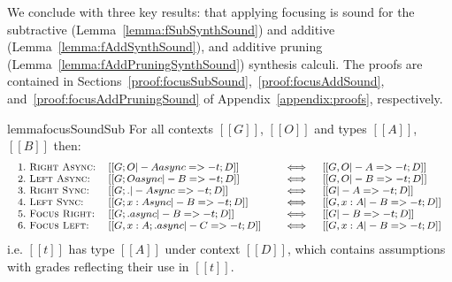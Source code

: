 We conclude with three key results: that applying focusing is sound for the
subtractive (Lemma~\ref{lemma:fSubSynthSound}) and additive
(Lemma~\ref{lemma:fAddSynthSound}), and additive pruning
(Lemma~\ref{lemma:fAddPruningSynthSound}) synthesis calculi. The proofs are
contained in Sections~\ref{proof:focusSubSound},~\ref{proof:focusAddSound},
and~\ref{proof:focusAddPruningSound} of Appendix~\ref{appendix:proofs},
respectively.

\begin{restatable}{lemma}{focusSoundSub}
  \label{lemma:fSubSynthSound}
For all contexts $[[ G ]]$, $[[ O ]]$ and types $[[ A ]]$, $[[ B]]$
then:
\begin{align*}
  {\footnotesize{
\begin{array}{lll}
 1.\ \textsc{Right Async:} & [[ G ; O |- A async =>- t ; D ]] \quad &\iff \quad [[ G , O |- A =>- t ; D ]]\\
 2.\ \textsc{Left Async:} & [[ G ; O async |- B =>- t ; D ]] \quad &\iff \quad [[ G , O |- B =>- t ; D ]]\\
 3.\ \textsc{Right Sync:} & [[ G ; . |- A sync =>- t ; D ]] \quad &\iff \quad [[ G |- A =>- t ; D ]]\\
 4.\ \textsc{Left Sync:} & [[ G ; {x : A }sync |- B =>- t ; D ]] \quad &\iff \quad [[ G, x : A |- B =>- t ; D ]]\\
 5.\ \textsc{Focus Right:} & [[ G ; . async |- B =>- t ; D ]] \quad &\iff \quad [[ G |- B =>- t ; D ]]\\
 6.\ \textsc{Focus Left:} & [[ G, x : A ; . async |- C =>- t ; D ]] \quad &\iff \quad [[ G, x : A |- B =>- t ; D ]]
\end{array}
  }}
\end{align*}
i.e. $[[ t ]]$ has type $[[ A ]]$
under context $[[ D ]]$,
which contains assumptions with grades reflecting their use in $[[ t ]]$.
\end{restatable}

